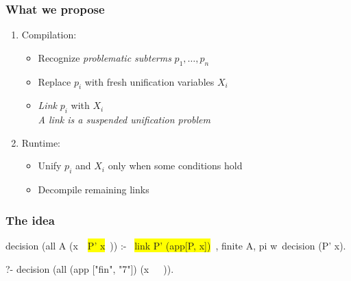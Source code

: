 \documentclass{pres}
\newcommand{\sepFrame}[1]{
  \section{#1}
  \begin{frame}
    \centering
    {\usebeamerfont*{frametitle}\usebeamercolor[fg]{frametitle} #1}
  \end{frame}
}
\begin{document}
\begin{frame}
  \frametitle{What we propose}

  \begin{enumerate}
    \item Compilation:
    \begin{itemize}
      \item Recognize \textit{problematic subterms} $p_1,\dots,p_n$
      \item Replace $p_i$ with fresh unification variables $X_i$
      \item \textit{Link} $p_i$ with $X_i$\\
        \quad \textit{A link is a suspended unification problem}
    \end{itemize}
    \item Runtime:
    \begin{itemize}
      \item Unify $p_i$ and $X_i$ only when some conditions hold
      \item Decompile remaining links
    \end{itemize}
  \end{enumerate}



\end{frame}

\begin{frame}[fragile]
  \frametitle{The idea}

  \begin{elpicode}
    decision (all A (x\ ~\colorbox{yellow}{P' x}~)) :-                      %
      ~\colorbox{yellow}{link P' (app[P, x])}~, 
      finite A,
      pi w\ decision (P' x).

    ?- decision (all (app ["fin", "7"])                 %
                        (x\ ~\appnfactPyg~)).
  \end{elpicode}
  

\end{frame}

\end{document}
